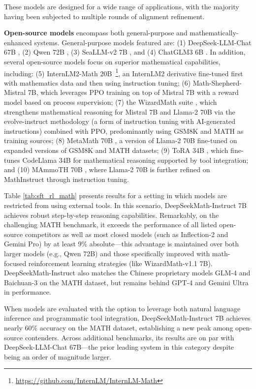 These models are designed for a wide range of applications, with the majority having been subjected to multiple rounds of alignment refinement.

\item \textbf{Open-source models} encompass both general-purpose and mathematically-enhanced systems. General-purpose models featured are: (1) DeepSeek-LLM-Chat 67B \citep{deepseek-llm}, (2) Qwen 72B \citep{qwen}, (3) SeaLLM-v2 7B \citep{seallm}, and (4) ChatGLM3 6B \citep{chatglm3}. In addition, several open-source models focus on superior mathematical capabilities, including: (5) InternLM2-Math 20B~\footnote{\url{https://github.com/InternLM/InternLM-Math}}, an InternLM2 derivative fine-tuned first with mathematics data and then using instruction tuning; (6) Math-Shepherd-Mistral 7B, which leverages PPO training \citep{schulman2017proximal} on top of Mistral 7B \citep{mistral} with a reward model based on process supervision; (7) the WizardMath suite \citep{wizardmath}, which strengthens mathematical reasoning for Mistral 7B and Llama-2 70B \citep{llama2} via the evolve-instruct methodology (a form of instruction tuning with AI-generated instructions) combined with PPO, predominantly using GSM8K and MATH as training sources; (8) MetaMath 70B \citep{metamath}, a version of Llama-2 70B fine-tuned on expanded versions of GSM8K and MATH datasets; (9) ToRA 34B \cite{tora}, which fine-tunes CodeLlama 34B for mathematical reasoning supported by tool integration; and (10) MAmmoTH 70B \citep{MathInstruct}, where Llama-2 70B is further refined on MathInstruct through instruction tuning.

Table \ref{tab:sft_rl_math} presents results for a setting in which models are restricted from using external tools. In this scenario, DeepSeekMath-Instruct 7B achieves robust step-by-step reasoning capabilities. Remarkably, on the challenging MATH benchmark, it exceeds the performance of all listed open-source competitors as well as most closed models (such as Inflection-2 and Gemini Pro) by at least 9\% absolute—this advantage is maintained over both larger models (e.g., Qwen 72B) and those specifically improved with math-focused reinforcement learning strategies (like WizardMath-v1.1 7B). DeepSeekMath-Instruct also matches the Chinese proprietary models GLM-4 and Baichuan-3 on the MATH dataset, but remains behind GPT-4 and Gemini Ultra in performance.

When models are evaluated with the option to leverage both natural language inference and programmatic tool integration, DeepSeekMath-Instruct 7B achieves nearly 60\% accuracy on the MATH dataset, establishing a new peak among open-source contenders. Across additional benchmarks, its results are on par with DeepSeek-LLM-Chat 67B—the prior leading system in this category despite being an order of magnitude larger.

